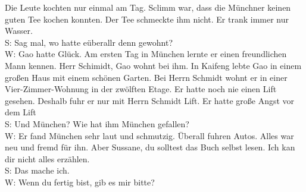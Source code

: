 Die Leute kochten nur einmal am Tag. Sclimm war,  dass die Münchner  keinen guten Tee kochen konnten.
Der Tee schmeckte ihm nicht. Er trank immer nur Wasser. \\
S: Sag mal, wo hatte eüberallr denn gewohnt? \\
W: Gao hatte Glück. Am ersten Tag in München lernte er einen freundlichen Mann kennen. Herr Schimidt,
Gao wohnt bei ihm. In Kaifeng lebte Gao in einem großen Haus mit einem schönen Garten.
Bei Herrn Schmidt wohnt er in einer Vier-Zimmer-Wohnung in der zwölften Etage.
Er hatte noch nie einen Lift gesehen.  Deshalb fuhr er nur mit Herrn Schmidt Lift.  Er hatte große Angst vor dem Lift  \\
S: Und München? Wie hat ihm München gefallen? \\
W: Er fand München sehr laut und schmutzig. Überall fuhren Autos.  Alles war neu und fremd für ihn. 
Aber Sussane, du solltest das Buch selbst lesen.  Ich kan dir nicht alles erzählen.  \\
S: Das mache ich. \\
W: Wenn du fertig bist, gib es mir bitte? \\

